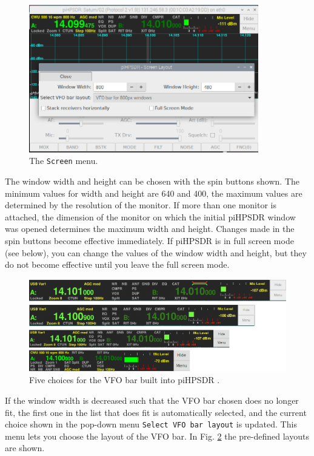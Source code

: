 \documentclass[12pt]{book}
\def\rett#1{\texttt{\color{red}#1}}
\def\bltt#1{\texttt{\color{blue}#1}}
\def\pH{pi\-HPSDR }
\begin{document}
\begin{figure}[ht]
\center
\includegraphics[width=10cm]{ScreenMenu.png}
\caption{The \bltt{Screen} menu.}
\label{fig:ScreenMenu}
\end{figure}

The window width and height can be chosen with the spin buttons shown. The minimum
values for width and height are 640 and 400, the maximum values are determined by
the resolution of the monitor. If more than one monitor is attached, the dimension
of the monitor on which the initial \pH window was opened determines
the maximum width and height. Changes made in the spin buttons become effective
immediately. If \pH is in full screen mode (see below), you can change the
values of the window width and height, but they do not become effective until
you leave the full screen mode.

\begin{figure}[ht!]
\center
\includegraphics[width=12cm]{VFObarChoice.png}
\caption{Five choices for the VFO bar built into \pH.}
\label{fig:VFObarChoice}
\end{figure}

If the window width is decreased such that the VFO bar chosen does no longer fit,
the first one in the list that does fit is automatically selected, and the
current choice shown in the
 pop-down menu \rett{Select VFO bar layout} is updated. This menu lets you choose
 the layout of the VFO
bar. In Fig. \ref{fig:VFObarChoice} the pre-defined layouts are shown.
\end{document}
